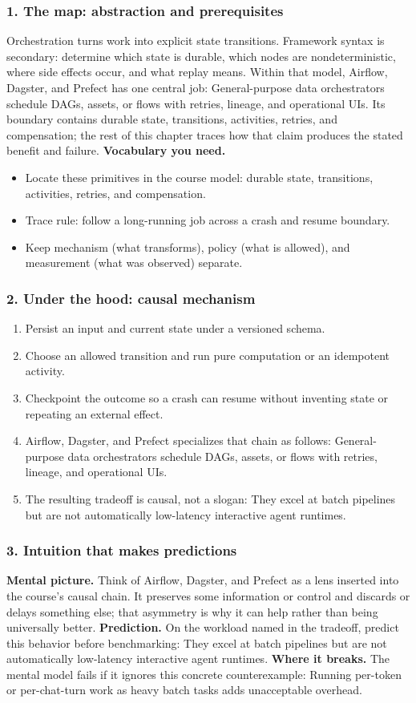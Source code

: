 \subsubsection*{1. The map: abstraction and prerequisites}
Orchestration turns work into explicit state transitions. Framework syntax is secondary: determine which state is durable, which nodes are nondeterministic, where side effects occur, and what replay means.
Within that model, Airflow, Dagster, and Prefect has one central job: General-purpose data orchestrators schedule DAGs, assets, or flows with retries, lineage, and operational UIs. Its boundary contains durable state, transitions, activities, retries, and compensation; the rest of this chapter traces how that claim produces the stated benefit and failure.
\textbf{Vocabulary you need.}\begin{itemize}
\item Locate these primitives in the course model: durable state, transitions, activities, retries, and compensation.
\item Trace rule: follow a long-running job across a crash and resume boundary.
\item Keep mechanism (what transforms), policy (what is allowed), and measurement (what was observed) separate.
\end{itemize}
\subsubsection*{2. Under the hood: causal mechanism}\begin{enumerate}
\item Persist an input and current state under a versioned schema.
\item Choose an allowed transition and run pure computation or an idempotent activity.
\item Checkpoint the outcome so a crash can resume without inventing state or repeating an external effect.
\item Airflow, Dagster, and Prefect specializes that chain as follows: General-purpose data orchestrators schedule DAGs, assets, or flows with retries, lineage, and operational UIs.
\item The resulting tradeoff is causal, not a slogan: They excel at batch pipelines but are not automatically low-latency interactive agent runtimes.
\end{enumerate}
\subsubsection*{3. Intuition that makes predictions}
\textbf{Mental picture.} Think of Airflow, Dagster, and Prefect as a lens inserted into the course's causal chain. It preserves some information or control and discards or delays something else; that asymmetry is why it can help rather than being universally better.
\textbf{Prediction.} On the workload named in the tradeoff, predict this behavior before benchmarking: They excel at batch pipelines but are not automatically low-latency interactive agent runtimes.
\textbf{Where it breaks.} The mental model fails if it ignores this concrete counterexample: Running per-token or per-chat-turn work as heavy batch tasks adds unacceptable overhead.
